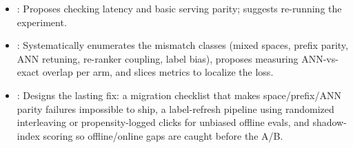 \begin{interviewq}
\goodgreat
\begin{itemize}
    \item {}: Proposes checking latency and basic serving
    parity; suggests re-running the experiment.
    \item {}: Systematically enumerates the mismatch classes
    (mixed spaces, prefix parity, ANN retuning, re-ranker coupling, label
    bias), proposes measuring ANN-vs-exact overlap per arm, and slices
    metrics to localize the loss.
    \item {}: Designs the lasting fix: a migration checklist
    that makes space/prefix/ANN parity failures impossible to ship, a
    label-refresh pipeline using randomized interleaving or
    propensity-logged clicks for unbiased offline evals, and shadow-index
    scoring so offline/online gaps are caught before the A/B.
\end{itemize}

\end{interviewq}
